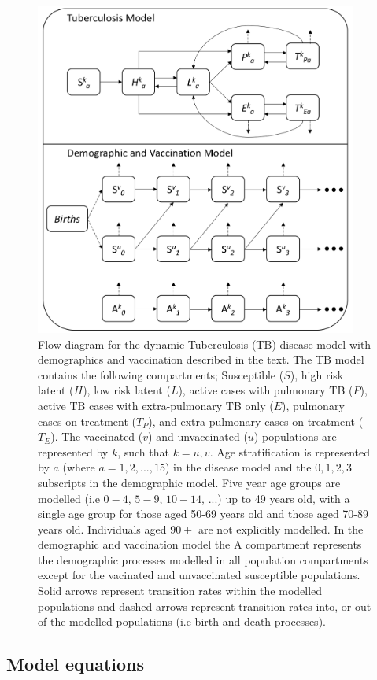 \documentclass[11pt,twoside]{bristolthesis}
\begin{document}
  \begin{figure}
  
  {\centering \includegraphics[width=400px]{chapters/model-development/resources/model_diagrams/tb_model_flow} 
  
  }
  
  \caption{Flow diagram for the dynamic Tuberculosis (TB) disease model with demographics and vaccination described in the text. The TB model contains the following compartments; Susceptible ($S$), high risk latent ($H$), low risk latent ($L$), active cases with pulmonary TB ($P$), active TB cases with extra-pulmonary TB only ($E$), pulmonary cases on treatment ($T_P$), and extra-pulmonary cases on treatment ($T_E$). The vaccinated ($v$) and unvaccinated ($u$) populations are represented by $k$, such that $k = u,v$. Age stratification is represented by $a$ (where $a = 1, 2, ...,15$) in the disease model and the $0, 1, 2, 3$ subscripts in the demographic model. Five year age groups are modelled (i.e $0-4$, $5-9$, $10-14$, ...) up to 49 years old, with a single age group for those aged 50-69 years old and those aged 70-89 years old. Individuals aged $90+$ are not explicitly modelled. In the demographic and vaccination model the A compartment represents the demographic processes modelled in all population compartments except for the vacinated and unvaccinated susceptible populations. Solid arrows represent transition rates within the modelled populations and dashed arrows represent transition rates into, or out of the modelled populations (i.e birth and death processes).}\label{fig:model-flow-diag}
  \end{figure}
  \hypertarget{model-equations}{%
  \subsection{Model equations}\label{model-equations}}
  
\end{document}
